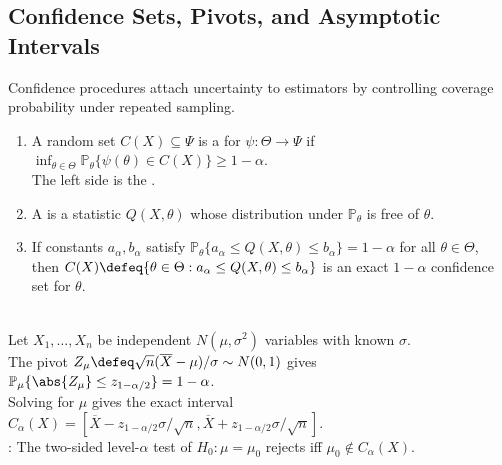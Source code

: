 \subsection{Confidence Sets, Pivots, and Asymptotic Intervals}

Confidence procedures attach uncertainty to estimators by controlling coverage probability under repeated sampling.

\begin{definition} \label{def:confidence-set-coverage} \label{def:pivot-confidence-construction} 
\begin{enumerate}[label=(\roman*)]
\setlength{\itemsep}{0pt}
\item A random set $C(X)\subseteq\Psi$ is a  for $\psi:\Theta\to\Psi$ if $\inf_{\theta\in\Theta}\mathbb{P}_\theta\{\psi(\theta)\in C(X)\}\geq1-\alpha$.\\
The left side is the .
\item A  is a statistic $Q(X,\theta)$ whose distribution under $\mathbb{P}_\theta$ is free of $\theta$.
\item If constants $a_\alpha,b_\alpha$ satisfy $\mathbb{P}_\theta\{a_\alpha\leq Q(X,\theta)\leq b_\alpha\}=1-\alpha$ for all $\theta\in\Theta$,\\
then $C(X)\defeq\{\theta\in\Theta:a_\alpha\leq Q(X,\theta)\leq b_\alpha\}$ is an exact $1-\alpha$ confidence set for $\theta$.
\end{enumerate}
\end{definition}

\begin{example} \label{ex:normal-mean-known-variance-confidence-interval} \\
Let $X_1,\ldots,X_n$ be independent $N(\mu,\sigma^2)$ variables with known $\sigma$.\\
The pivot $Z_\mu\defeq\sqrt n(\overline{X}-\mu)/\sigma\sim N(0,1)$ gives $\mathbb{P}_\mu\{\abs{Z_\mu}\leq z_{1-\alpha/2}\}=1-\alpha$.\\
Solving for $\mu$ gives the exact interval $C_\alpha(X)=[\overline{X}-z_{1-\alpha/2}\sigma/\sqrt n,\overline{X}+z_{1-\alpha/2}\sigma/\sqrt n]$.\\
: The two-sided level-$\alpha$ test of $H_0:\mu=\mu_0$ rejects iff $\mu_0\notin C_\alpha(X)$.
\end{example}

